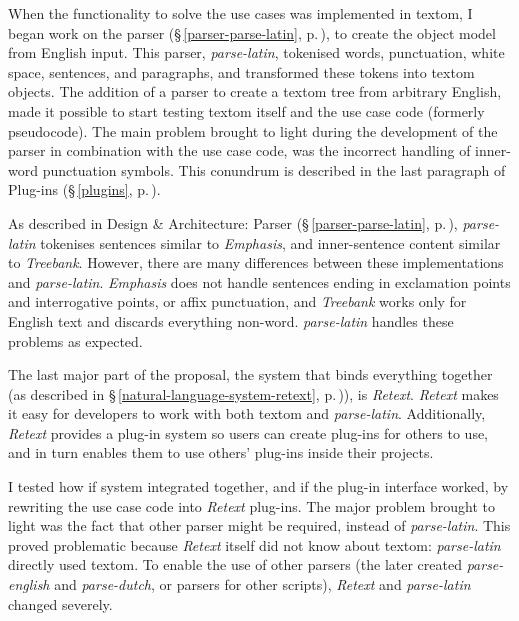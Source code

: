 When the functionality to solve the use cases was implemented in \gls{textom},
  I began work on the parser (§\,\ref{parser-parse-latin},
  p.\,\pageref{parser-parse-latin}), to create the object model from
  English input.
This parser, \emph{parse-latin}, tokenised words, punctuation, white space,
  sentences, and paragraphs, and transformed these tokens into \gls{textom}
  objects.
The addition of a parser to create a \gls{textom} tree from arbitrary
  English, made it possible to start testing \gls{textom} itself and the use
  case code (formerly pseudocode).
The main problem brought to light during the development of the parser in
  combination with the use case code, was the incorrect
  handling of inner-word punctuation symbols.
This conundrum is described in the last paragraph of Plug-ins
  (§\,\ref{plugins}, p.\,\pageref{plugins}).

As described in Design \& Architecture: Parser (§\,\ref{parser-parse-latin},
  p.\,\pageref{parser-parse-latin}), \emph{parse-latin} tokenises sentences
  similar to \emph{Emphasis}, and inner-sentence content similar
  to \emph{Treebank}.
However, there are many differences between these implementations and
  \emph{parse-latin}.
\emph{Emphasis} does not handle sentences ending in exclamation
  points and interrogative points, or affix punctuation, and \emph{Treebank}
  works only for English text and discards everything non-word.
\emph{parse-latin} handles these problems as expected.

The last major part of the proposal, the system that binds everything
  together (as described in §\,\ref{natural-language-system-retext},
  p.\,\pageref{natural-language-system-retext})), is \emph{Retext}.
\emph{Retext} makes it easy for developers to work with both \gls{textom}
  and \emph{parse-latin}.
Additionally, \emph{Retext} provides a plug-in system so users can create
  plug-ins for others to use, and in turn enables them to use others'
  plug-ins inside their projects.

I tested how if system integrated together, and if the plug-in interface
  worked, by rewriting the use case code into \emph{Retext} plug-ins.
The major problem brought to light was the fact that other parser might be
  required, instead of \emph{parse-latin}.
This proved problematic because \emph{Retext} itself did not know about
  \gls{textom}: \emph{parse-latin} directly used \gls{textom}.
To enable the use of other parsers (the later created \emph{parse-english}
  and \emph{parse-dutch}, or parsers for other scripts),
  \emph{Retext} and \emph{parse-latin} changed severely.




